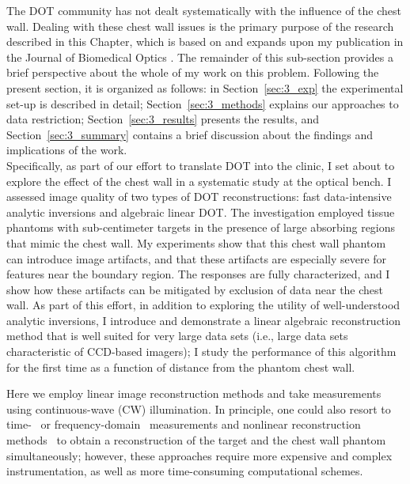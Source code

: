 The DOT community has not dealt systematically with the influence of the chest wall. Dealing with these chest wall issues is the primary purpose of the research described in this Chapter, which is based on and expands upon my publication in the Journal of Biomedical Optics \cite{Ban2013}.  The remainder of this sub-section provides a brief perspective about the whole of my work on this problem. Following the present section, it is organized as follows: in Section~\ref{sec:3_exp} the experimental set-up is described in detail;  Section~\ref{sec:3_methods} explains our approaches to data restriction; Section~\ref{sec:3_results} presents the results, and Section~\ref{sec:3_summary} contains a brief discussion about the findings and implications of the work.
\\ \indent
Specifically, as part of our effort to translate DOT into the clinic, I set about to explore the effect of the chest wall in a systematic study at the optical bench. I assessed image quality of two types of DOT reconstructions: fast data-intensive analytic inversions and algebraic linear DOT. The investigation employed tissue phantoms with sub-centimeter targets in the presence of large absorbing regions that mimic the chest wall. My experiments show that this chest wall phantom can introduce image artifacts, and that these artifacts are especially severe for features near the boundary region.  The responses are fully characterized, and I show how these artifacts can be mitigated by exclusion of data near the chest wall. As part of this effort, in addition to exploring the utility of well-understood analytic inversions, I introduce and demonstrate a linear algebraic reconstruction method that is well suited for very large data sets (i.e., large data sets characteristic of CCD-based imagers); I study the performance of this algorithm for the first time as a function of distance from the phantom chest wall.

Here we employ linear image reconstruction methods and take measurements using continuous-wave (CW) illumination. In principle, one could also resort to time-~\cite{Patterson1989,Benaron1993,Andersson-Engels1990,Jacques1989,Schmidt2000,Ntziachristos1998} or frequency-domain~\cite{Gratton1990,Fishkin1993,Chance1998,Pogue1994} measurements and nonlinear reconstruction methods~\cite{Arridge1999,Markel2003a} to obtain a reconstruction of the target and the chest wall phantom simultaneously; however, these approaches require more expensive and complex instrumentation, as well as more time-consuming computational schemes.


